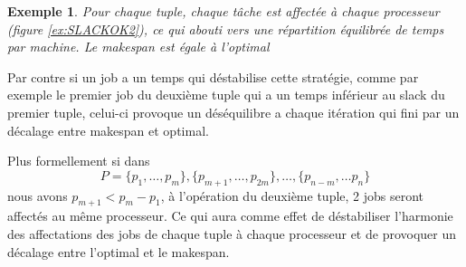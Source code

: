 \documentclass[a4paper,12pt]{report}
\theoremstyle{plain}				%
\newtheorem{example}{Exemple}
\theoremstyle{definition}				%
\newcommand{\jb}[1]{\todo[author=JB,color=orange,inline]{#1}}
\begin{document}
\begin{example}
Pour chaque tuple, chaque tâche est affectée à chaque processeur (figure \ref{ex:SLACKOK2}), ce qui abouti vers une répartition équilibrée de temps par machine. Le makespan est égale à l'optimal

\end{example}

Par contre si un job a un temps qui déstabilise cette stratégie, comme par exemple le premier job du deuxième tuple qui a un temps inférieur au slack du premier tuple, celui-ci provoque un déséquilibre a chaque itération
qui fini par un décalage entre makespan et optimal.     

Plus formellement si dans 
$$P = \{p_1, \ldots, p_m\}, \{p_{m+1}, \ldots, p_{2m}\}, \ldots, \{p_{n-m}, \ldots p_n\}$$
nous avons $p_{m+1} < p_m - p_1$, à l’opération du deuxième tuple, 2 jobs seront affectés au même processeur. Ce qui aura comme effet de déstabiliser l'harmonie des affectations des jobs de chaque tuple à chaque processeur et de provoquer un décalage entre l'optimal et le makespan.
\end{document}
